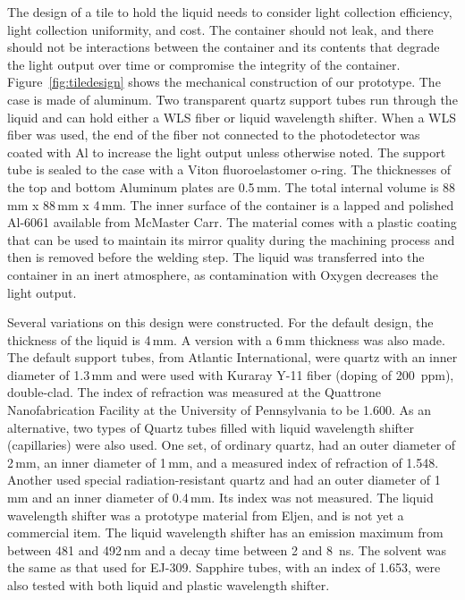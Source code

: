 \documentclass[review]{elsarticle}
\begin{document}
The design of a tile to hold the liquid needs to consider light
collection efficiency, light collection uniformity, and cost. The
container should not leak, and there should not be interactions
between the container and its contents that degrade the light output
over time or compromise the integrity of the
container. 
Figure~\ref{fig:tiledesign} shows the mechanical
construction of our prototype. The case is made of aluminum. Two
transparent quartz support tubes
run through the
liquid and can hold either a WLS fiber or liquid
wavelength shifter.
When a WLS fiber was
used, the end of the fiber not connected to the photodetector was
coated with Al to increase the light output unless otherwise
noted. The support tube is sealed to the case with a Viton
fluoroelastomer o-ring. The thicknesses of the top and bottom Aluminum
plates are 0.5\,mm. The total internal volume is 88\,mm x 88\,mm x
4\,mm. The inner surface of the container is a lapped and polished
Al-6061 available from McMaster Carr. The material comes with a
plastic coating that can be used to maintain its mirror quality during
the machining process and then is removed before the welding step. The
liquid was transferred into the container in an inert atmosphere, as
contamination with Oxygen decreases the light output.

Several variations on this design were constructed. For the default
design, the thickness of the liquid is 4\,mm. A version with a 6\,mm
thickness was also made. The default
support tubes, from Atlantic International, were quartz with an inner
diameter of 1.3\,mm and were used with Kuraray Y-11 fiber (doping of
200~ppm), double-clad.
The index of refraction was measured at the Quattrone
Nanofabrication Facility at the University of Pennsylvania to be
1.600.
As an alternative, two types of
Quartz tubes filled with liquid wavelength
shifter (capillaries) were also used.  
One set, of ordinary quartz, had an outer diameter of 2\,mm,
an inner diameter of 1\,mm, and a measured index of refraction of 1.548.
Another used special radiation-resistant quartz and had an outer diameter of 1\,mm and an
inner diameter of 0.4\,mm.  Its index was not measured.
The liquid wavelength shifter was a prototype
material from Eljen, and is not yet a commercial item. The liquid
wavelength shifter has an emission maximum from between 481 and 492\,nm
and a decay time between 2 and 8~ns. The solvent was the same as that
used for EJ-309. Sapphire tubes, with an index of 1.653,
were also tested with both liquid and
plastic wavelength shifter.
\end{document}
